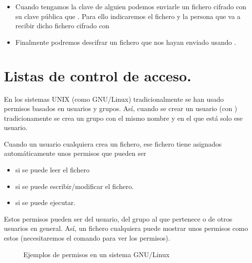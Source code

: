 \documentclass[letterpaper,10pt,spanish]{sphinxmanual}
\begin{document}
\begin{itemize}
\item {} 
Cuando tengamos la clave de alguien podemos enviarle un fichero cifrado con su clave pública que  . Para ello indicaremos el fichero y la persona que va a recibir dicho fichero cifrado con 

\item {} 
Finalmente podremos descifrar un fichero que nos hayan enviado usando  .

\end{itemize}


\section{Listas de control de acceso.}
\label{\detokenize{tema_pautas_seguridad_informatica/tema_pautas_seguridad_informatica:listas-de-control-de-acceso}}
En los sistemas UNIX (como GNU/Linux) tradicionalmente se han usado permisos basados en usuarios y grupos. Así, cuando se crear un usuario (con ) tradicionamente se crea un grupo con el mismo nombre y en el que está solo ese usuario.

Cuando un usuario cualquiera crea un fichero, ese fichero tiene asignados automáticamente unos permisos que pueden ser
\begin{itemize}
\item {} 
 si se puede leer el fichero

\item {} 
 si se puede escribir/modificar el fichero.

\item {} 
 si se puede ejecutar.

\end{itemize}

Estos permisos pueden ser del usuario, del grupo al que pertenece o de otros usuarios en general. Así, un fichero cualquiera puede mostrar unos permisos como estos (necesitaremos el comando  para ver los permisos).

\begin{figure}[htbp]
\centering
\capstart

\noindent{}
\caption{Ejemplos de permisos en un sistema GNU/Linux}\label{\detokenize{tema_pautas_seguridad_informatica/tema_pautas_seguridad_informatica:id1}}\end{figure}
\end{document}
